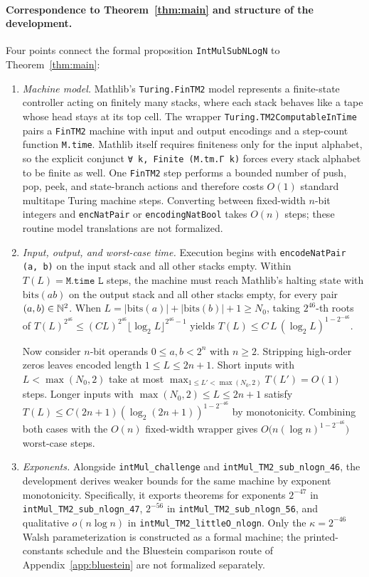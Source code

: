 \paragraph{Correspondence to Theorem~\ref{thm:main} and structure of the development.}
Four points connect the formal proposition \texttt{IntMulSubNLogN} to Theorem~\ref{thm:main}:
\begin{enumerate}[label=(\alph*),leftmargin=*,itemsep=2pt]
\item \emph{Machine model.} Mathlib's \texttt{Turing.\allowbreak FinTM2} model represents a finite-state controller acting on finitely many stacks, where each stack behaves like a tape whose head stays at its top cell. The wrapper \texttt{Turing.TM2ComputableInTime} pairs a \texttt{FinTM2} machine with input and output encodings and a step-count function \texttt{M.time}. Mathlib itself requires finiteness only for the input alphabet, so the explicit conjunct \texttt{∀ k, Finite (M.tm.Γ k)} forces every stack alphabet to be finite as well. One \texttt{FinTM2} step performs a bounded number of push, pop, peek, and state-branch actions and therefore costs $O(1)$ standard multitape Turing machine steps. Converting between fixed-width $n$-bit integers and \texttt{encNatPair} or \texttt{encodingNatBool} takes $O(n)$ steps; these routine model translations are not formalized.

\item \emph{Input, output, and worst-case time.} Execution begins with \texttt{encodeNatPair (a, b)} on the input stack and all other stacks empty. Within $T(L)=\texttt{M.time L}$ steps, the machine must reach Mathlib's halting state with $\mathrm{bits}(ab)$ on the output stack and all other stacks empty, for every pair $(a,b)\in\mathbb{N}^2$. When $L=|\mathrm{bits}(a)|+|\mathrm{bits}(b)|+1\ge N_0$, taking $2^{46}$-th roots of $T(L)^{2^{46}}\le (CL)^{2^{46}}\lfloor\log_2 L\rfloor^{2^{46}-1}$ yields $T(L)\le C\,L\,(\log_2 L)^{1-2^{-46}}$.

Now consider $n$-bit operands $0\le a,b<2^n$ with $n\ge 2$. Stripping high-order zeros leaves encoded length $1\le L\le 2n+1$. Short inputs with $L<\max(N_0,2)$ take at most $\max_{1\le L'<\max(N_0,2)} T(L')=O(1)$ steps. Longer inputs with $\max(N_0,2)\le L\le 2n+1$ satisfy $T(L)\le C(2n+1)(\log_2(2n+1))^{1-2^{-46}}$ by monotonicity. Combining both cases with the $O(n)$ fixed-width wrapper gives $O\bigl(n(\log n)^{1-2^{-46}}\bigr)$ worst-case steps.

\item \emph{Exponents.} Alongside \texttt{intMul\_challenge} and \texttt{intMul\_TM2\_sub\_nlogn\_46}, the development derives weaker bounds for the same machine by exponent monotonicity. Specifically, it exports theorems for exponents $2^{-47}$ in \texttt{intMul\_TM2\_sub\_nlogn\_47}, $2^{-56}$ in \texttt{intMul\_TM2\_sub\_nlogn\_56}, and qualitative $o(n\log n)$ in \texttt{intMul\_TM2\_littleO\_nlogn}. Only the $\kappa=2^{-46}$ Walsh parameterization is constructed as a formal machine; the printed-constants schedule and the Bluestein comparison route of Appendix~\ref{app:bluestein} are not formalized separately.


\end{enumerate}
